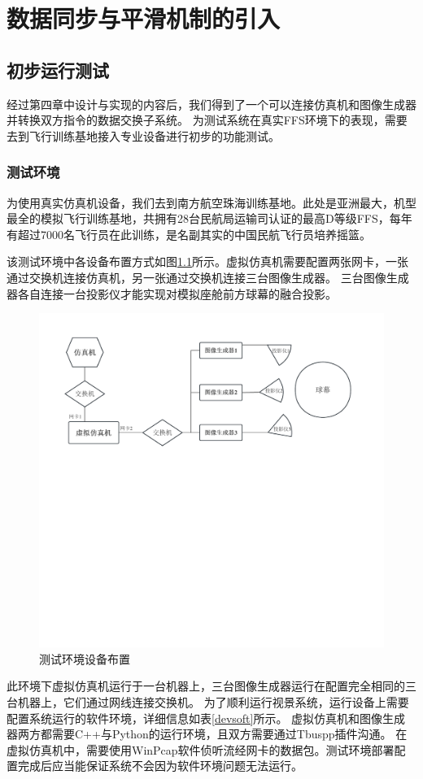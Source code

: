 \chapter{数据同步与平滑机制的引入}
\section{初步运行测试}
经过第四章中设计与实现的内容后，我们得到了一个可以连接仿真机和图像生成器并转换双方指令的数据交换子系统。
为测试系统在真实FFS环境下的表现，需要去到飞行训练基地接入专业设备进行初步的功能测试。
\subsection{测试环境}
为使用真实仿真机设备，我们去到南方航空珠海训练基地。此处是亚洲最大，机型最全的模拟飞行训练基地，共拥有28台民航局运输司认证的最高D等级FFS，每年有超过7000名飞行员在此训练，是名副其实的中国民航飞行员培养摇篮。
\par
该测试环境中各设备布置方式如图\ref{testenv}所示。虚拟仿真机需要配置两张网卡，一张通过交换机连接仿真机，另一张通过交换机连接三台图像生成器。
三台图像生成器各自连接一台投影仪才能实现对模拟座舱前方球幕的融合投影。
\begin{figure}[h!]
    \begin{center}
        \includegraphics[width=\textwidth]{pictures/testenv.pdf}
        \caption{测试环境设备布置}
        \label{testenv}
    \end{center}
\end{figure}
\par
此环境下虚拟仿真机运行于一台机器上，三台图像生成器运行在配置完全相同的三台机器上，它们通过网线连接交换机。
为了顺利运行视景系统，运行设备上需要配置系统运行的软件环境，详细信息如表\ref{devsoft}所示。
虚拟仿真机和图像生成器两方都需要C++与Python的运行环境，且双方需要通过Tbuspp插件沟通。
在虚拟仿真机中，需要使用WinPcap软件侦听流经网卡的数据包。测试环境部署配置完成后应当能保证系统不会因为软件环境问题无法运行。

